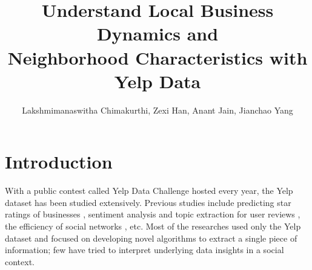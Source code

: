 \documentclass[compsoc]{IEEEtran}
\begin{document}

\title{Understand Local Business Dynamics and \\
Neighborhood Characteristics with Yelp Data} %

\author{Lakshmimanaswitha Chimakurthi, Zexi Han, Anant Jain, Jianchao Yang}


\maketitle

\IEEEdisplaynontitleabstractindextext

\section{Introduction}

With a public contest called Yelp Data Challenge hosted every year, the Yelp dataset has been studied extensively. Previous studies include predicting star ratings of businesses  \cite{kongpredicting}, sentiment analysis and topic extraction for user reviews \cite{huang2014improving}, the efficiency of social networks \cite{wong2016efficiency}, etc. Most of the researches used only the Yelp dataset and focused on developing novel algorithms to extract a single piece of information; few have tried to interpret underlying data insights in a social context.
\end{document}
